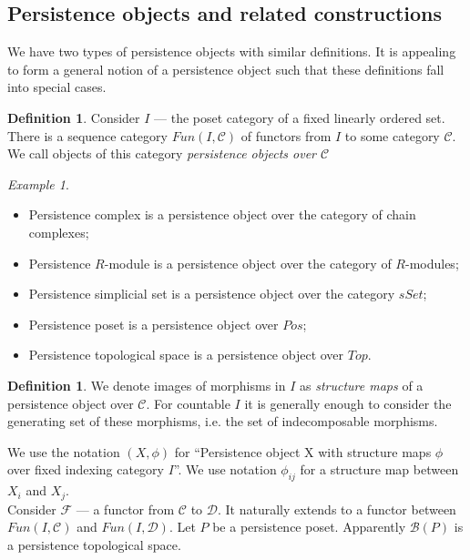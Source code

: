 \documentclass[a4paper, 12pt]{article}
\newcounter{stmcounter}[section]
\numberwithin{equation}{section}
\theoremstyle{definition}
\newtheorem{definition}[stmcounter]{Definition}
\theoremstyle{remark}
\newtheorem{example}[stmcounter]{Example}
\newcommand{\define}[1]{{\textit{#1}}}
\begin{document}
\subsection{Persistence objects and related constructions}

We have two types of persistence objects with similar definitions. It is appealing to form a general notion of a persistence object such that these definitions fall into special cases.\\

\begin{definition}
  Consider $I$ --- the poset category of a fixed linearly ordered set. There is a sequence category $Fun(I, \mathcal{C})$ of functors from $I$ to some category $\mathcal{C}$. We call objects of this category \define{persistence objects over $\mathcal{C}$}
\end{definition}

\begin{example} ~ \par
  \begin{itemize}
    \item Persistence complex is a persistence object over the category of chain complexes;
    \item Persistence $R$-module is a persistence object over the category of $R$-modules;
    \item Persistence simplicial set is a persistence object over the category $sSet$;
    \item Persistence poset is a persistence object over $Pos$;
    \item Persistence topological space is a persistence object over $Top$.
  \end{itemize}
\end{example}

\begin{definition}
  We denote images of morphisms in $I$ as \define{structure maps} of a persistence object over $\mathcal{C}$. For countable $I$ it is generally enough to consider the generating set of these morphisms, i.e. the set of indecomposable morphisms.
\end{definition}

We use the notation $(X,\phi)$ for ``Persistence object X with structure maps $\phi$ over fixed indexing category $I$''. We use notation $\phi_{ij}$ for a structure map between $X_i$ and $X_{j}$.\\

Consider $\mathcal{F}$ --- a functor from $\mathcal{C}$ to $\mathcal{D}$. It naturally extends to a functor between $Fun(I,\mathcal{C})$ and $Fun(I,\mathcal{D})$. Let $P$ be a persistence poset. Apparently $\mathcal{B}(P)$ is a persistence topological space.\\
\end{document}
